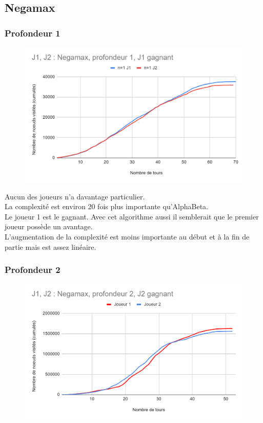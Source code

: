 \documentclass[12pt]{article}
\begin{document}
\subsection{Negamax}

\subsubsection{Profondeur 1}

\begin{figure}[!h]
   \includegraphics[width=\textwidth]{prof1negamax.png}
\end{figure}

Aucun des joueurs n’a davantage particulier.\\
La complexité est environ 20 fois plus importante qu’AlphaBeta.\\
Le joueur 1 est le gagnant. Avec cet algorithme aussi il semblerait que le premier joueur possède un avantage.\\
L’augmentation de la complexité est moins importante au début et à la fin de partie mais est assez linéaire.

\subsubsection{Profondeur 2}

\begin{figure}[!h]
   \includegraphics[width=\textwidth]{prof2negamax.png}
\end{figure}
\end{document}
